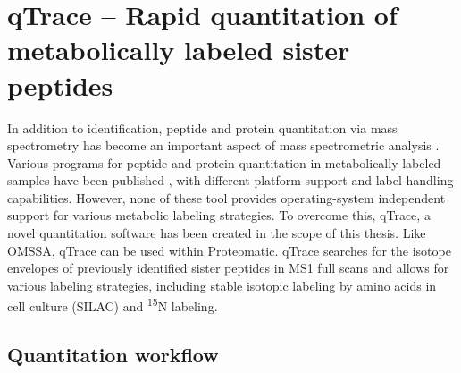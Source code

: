 \cleardoublepage
\chapter{qTrace -- Rapid quantitation of metabolically labeled sister peptides}
\label{appendix-qtrace}

In addition to identification, peptide and protein quantitation via mass 
spectrometry has become an important aspect of mass spectrometric analysis 
\citep{Kline2010, Schulze2010}. 
Various programs for peptide and protein quantitation in metabolically labeled 
samples have been published \citep{Han2001, Li2003, Saito2007, Park2008, 
Cox2008, Mortensen2010}, with different platform support and label handling 
capabilities. 
However, none of these tool provides operating-system independent support
for various metabolic labeling strategies.
To overcome this, qTrace, a novel quantitation software has been 
created in the scope of this thesis.
Like OMSSA, qTrace can be 
used within Proteomatic.
qTrace searches for the isotope envelopes of previously identified sister 
peptides in MS1 full scans and allows for various labeling strategies, 
including stable isotopic labeling by amino acids in cell culture (SILAC) 
and \textsuperscript{15}N labeling.

\section*{Quantitation workflow}

